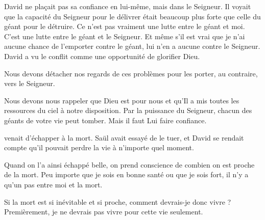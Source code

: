 David ne plaçait pas sa confiance en lui-même, mais dans le Seigneur.
 Il voyait que la capacité du Seigneur pour le délivrer était
 beaucoup plus forte que celle du géant pour le détruire.
 \og Ce n'est pas vraiment une lutte entre le géant et moi.
 C'est une lutte entre le géant et le Seigneur.
 Et même s'il est vrai que je n'ai aucune chance de l'emporter contre le géant,
 lui n'en a aucune contre le Seigneur. \fg{}
 David a vu le conflit comme une opportunité de glorifier Dieu.


Nous devons détacher nos regards de ces problèmes pour les porter,
 au contraire, vers le Seigneur.

Nous devons nous rappeler que Dieu est pour nous et qu'Il a mis
 toutes les ressources du ciel à notre disposition.
 Par la puissance du Seigneur, chacun des géants de votre vie peut tomber.
 Mais il faut Lui faire confiance. 

\dvrule







 venait d'échapper à la mort.
 Saül avait essayé de le tuer, et David se rendait compte
 qu'il pouvait perdre la vie à n'importe quel moment.

Quand on l'a ainsi échappé belle, on prend conscience de combien
 on est proche de la mort.
 Peu importe que je sois en bonne santé ou que je sois fort,
 il n'y a qu'un pas entre moi et la mort.

Si la mort est si inévitable et si proche, comment devrais-je donc vivre ?
 Premièrement, je ne devrais pas vivre pour cette vie seulement.


